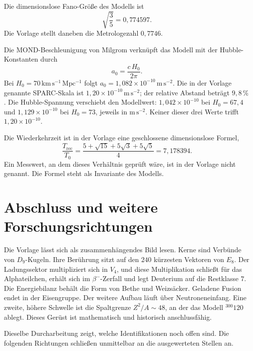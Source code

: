 \documentclass[11pt,a4paper]{article}
\theoremstyle{definition}
\theoremstyle{remark}
\newcommand{\Dn}{D_9}
\newcommand{\Ee}{E_8}
\newcommand{\Vf}{V_4}
\begin{document}
Die dimensionslose Fano-Größe des Modells ist
\begin{equation}
\sqrt{\frac{3}{5}}=0{,}774597.
\end{equation}
Die Vorlage stellt daneben die Metrologezahl \(0{,}7746\).

Die MOND-Beschleunigung von Milgrom \cite{Milgrom1983} verknüpft das Modell mit der Hubble-Konstanten durch
\begin{equation}
a_0=\frac{c\,H_0}{2\pi}.
\end{equation}
Bei \(H_0=70\,\mathrm{km\,s^{-1}\,Mpc^{-1}}\) folgt \(a_0=1{,}082\times 10^{-10}\,\mathrm{m\,s^{-2}}\). Die in der Vorlage genannte SPARC-Skala ist \(1{,}20\times 10^{-10}\,\mathrm{m\,s^{-2}}\); der relative Abstand beträgt \(9{,}8\,\%\). Die Hubble-Spannung verschiebt den Modellwert: \(1{,}042\times 10^{-10}\) bei \(H_0=67{,}4\) und \(1{,}129\times 10^{-10}\) bei \(H_0=73\), jeweils in \(\mathrm{m\,s^{-2}}\). Keiner dieser drei Werte trifft \(1{,}20\times 10^{-10}\).

Die Wiederkehrzeit ist in der Vorlage eine geschlossene dimensionslose Formel,
\begin{equation}
\label{eq:trec}
\frac{T_{\mathrm{rec}}}{T_0}
=\frac{5+\sqrt{15}+5\sqrt{3}+5\sqrt{5}}{4}
=7{,}178394.
\end{equation}
Ein Messwert, an dem dieses Verhältnis geprüft wäre, ist in der Vorlage nicht genannt. Die Formel steht als Invariante des Modells.

\section{Abschluss und weitere Forschungsrichtungen}
\label{sec:ausblick}

Die Vorlage lässt sich als zusammenhängendes Bild lesen. Kerne sind Verbünde von \(\Dn\)-Kugeln. Ihre Berührung sitzt auf den \(240\) kürzesten Vektoren von \(\Ee\). Der Ladungssektor multipliziert sich in \(\Vf\), und diese Multiplikation schließt für das Alphateilchen, erhält sich im \(\beta^-\)-Zerfall und legt Deuterium auf die Restklasse \(7\). Die Energiebilanz behält die Form von Bethe und Weizsäcker. Geladene Fusion endet in der Eisengruppe. Der weitere Aufbau läuft über Neutroneneinfang. Eine zweite, höhere Schwelle ist die Spaltgrenze \(Z^2/A\sim 48\), an der das Modell \(^{300}120\) ablegt. Dieses Gerüst ist mathematisch und historisch anschlussfähig.

Dieselbe Durcharbeitung zeigt, welche Identifikationen noch offen sind. Die folgenden Richtungen schließen unmittelbar an die ausgewerteten Stellen an.
\end{document}
